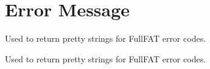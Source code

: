 \hypertarget{group___e_r_r}{}\section{Error Message}
\label{group___e_r_r}


Used to return pretty strings for Full\+F\+AT error codes.  


Used to return pretty strings for Full\+F\+AT error codes. 

